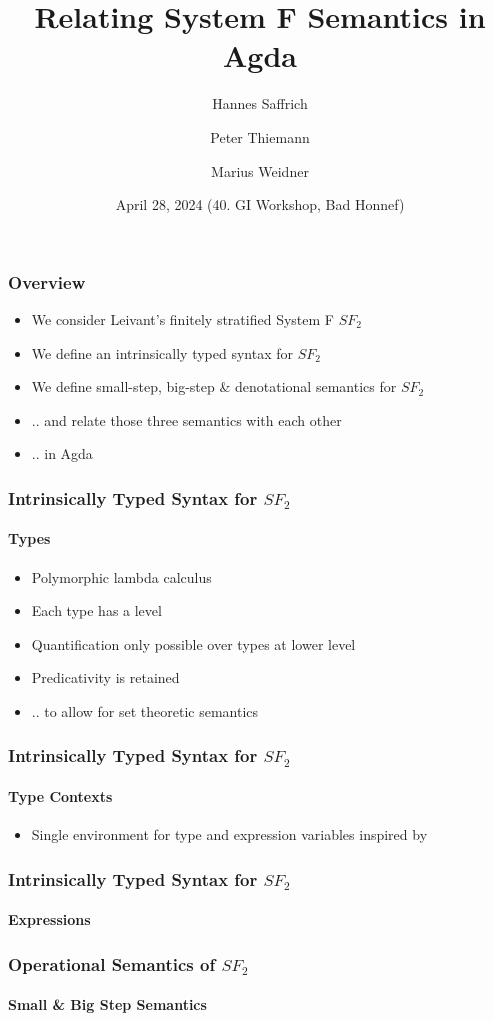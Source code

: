 \documentclass[dvipsnames,aspectratio=169,pdftex]{beamer}
\title{Relating System F Semantics in Agda}
\author[Saffrich, Thiemann, Weidner] {
  Hannes Saffrich \and 
  Peter Thiemann \and
  Marius Weidner
}
\institute{University of Freiburg}
\date{April 28, 2024 (40. GI Workshop, Bad Honnef)}
\begin{document}
\begin{frame}{\null}
  \titlepage 
\end{frame}

\begin{frame}[fragile]
  \frametitle{Overview}
  \begin{itemize}
    \item We consider Leivant's finitely stratified System F $SF_2$ \cite{DBLP:journals/iandc/Leivant91}
    \item We define an intrinsically typed syntax for $SF_2$
    \item We define small-step, big-step \& denotational semantics for $SF_2$
    \item .. and relate those three semantics with each other
    \item .. in Agda
  \end{itemize}
\end{frame}

\begin{frame}
  \frametitle{Intrinsically Typed Syntax for $SF_2$}
  \framesubtitle{Types}
  \TFLEnv
  \TFType
  \begin{itemize}
    \item Polymorphic lambda calculus \cite{girard72:_inter,DBLP:conf/programm/Reynolds74}
    \item Each type has a level
    \item Quantification only possible over types at lower level
    \item Predicativity is retained
    \item .. to allow for set theoretic semantics
  \end{itemize}
\end{frame}

\begin{frame}
  \frametitle{Intrinsically Typed Syntax for $SF_2$}
  \framesubtitle{Type Contexts}
  \TFTVEnv
  \TFinn
  \begin{itemize}
    \item Single environment for type and expression variables inspired by \cite{DBLP:conf/mpc/ChapmanKNW19}
  \end{itemize}
\end{frame}

\begin{frame}
  \frametitle{Intrinsically Typed Syntax for $SF_2$}
  \framesubtitle{Expressions}
  \TFExprExcerpt
\end{frame}

\begin{frame}
  \frametitle{Operational Semantics of $SF_2$}
  \framesubtitle{Small \& Big Step Semantics}
  \SmallStepSingleReductionExcerpt
  \SmallStepSemanticsExcerpt
\end{frame}
\end{document}
